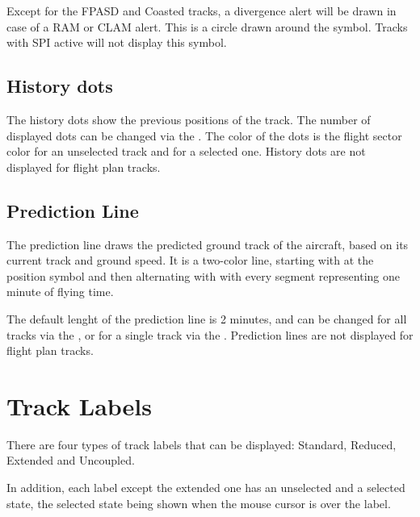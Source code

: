 \documentclass[a4paper,oneside,11pt]{memoir}
\begin{document}

Except for the FPASD and Coasted tracks, a divergence alert will be drawn in case of a RAM
or CLAM alert. This is a circle drawn around the symbol. Tracks with SPI active will not display this symbol.


\subsection{History dots}

The history dots show the previous positions of the track. The number of displayed dots can be changed via the . The color of the dots is the flight sector color for an unselected track and  for a selected one. History dots are not displayed for flight plan tracks.

\subsection{Prediction Line}

The prediction line draws the predicted ground track of the aircraft, based on its current track and ground speed. It is a two-color line, starting with  at the position symbol and then alternating with  with every segment representing one minute of flying time. 

The default lenght of the prediction line is 2 minutes, and can be changed for all tracks via the , or for a single track via the . Prediction lines are not displayed for flight plan tracks.


\section{Track Labels}
\label{tlabel}

There are four types of track labels that can be displayed: Standard, Reduced, Extended and Uncoupled.

In addition, each label except the extended one has an unselected and a selected state, the selected state being shown when the mouse cursor is over the label.
\end{document}
